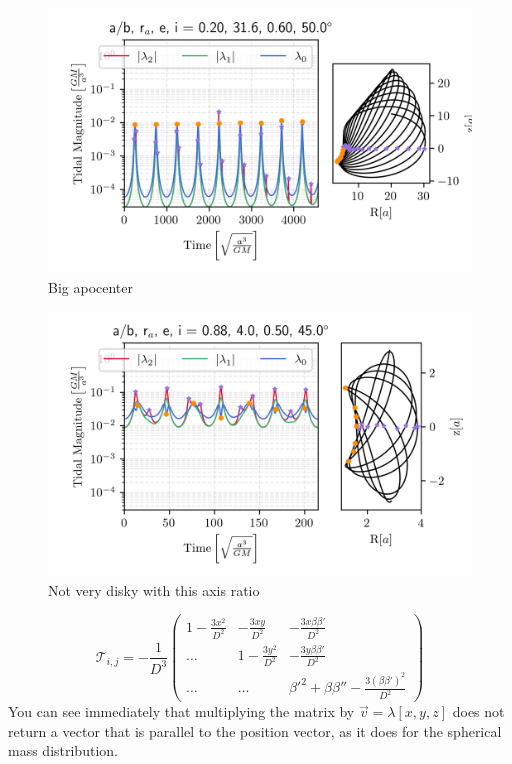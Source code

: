             \begin{figure}
                \includegraphics[width=\linewidth]{images/miyamoto_disc_shocks_ab_rp_e_i_0.20_31.6_0.60_50.0.png}
                \caption{Big apocenter}
                \label{fig:miyamoto_disc_shocks_big_apocenter}
            \end{figure}
            
            \begin{figure}
                \includegraphics[width=\linewidth]{images/miyamoto_disc_shocks_ab_rp_e_i_0.88_4.0_0.50_45.0.png}
                \caption{Not very disky with this axis ratio}
                \label{fig:miyamoto_disc_shocks_weak_shocks}
            \end{figure}


            \begin{equation}
                \mathcal{T}_{i,j}=-\frac{1}{D^3}\left(\begin{matrix}
                    1-\frac{3x^2}{D^2} & -\frac{3xy}{D^2} & -\frac{3x\beta \beta'}{D^2} \\
                    \dots & 1-\frac{3y^2}{D^2} & -\frac{3y\beta \beta'}{D^2} \\
                    \dots & \dots & \beta'^2 + \beta \beta'' -\frac{3\left(\beta\beta'\right)^2}{D^2}
                \end{matrix}\right)
            \end{equation}    
            You can see immediately that multiplying the matrix by $\vec{v}=\lambda\left[x,y,z\right]$ does not return a vector that is parallel to the position vector, as it does for the spherical mass distribution. 

